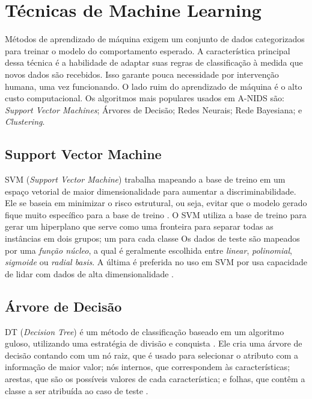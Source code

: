  \section{Técnicas de Machine Learning}
 Métodos de aprendizado de máquina exigem um conjunto de dados categorizados para treinar o modelo do comportamento
 esperado. A característica principal dessa técnica é a habilidade de adaptar suas regras de classificação à medida que
 novos dados são recebidos. Isso garante pouca necessidade por intervenção humana, uma vez funcionando. O lado ruim
 do aprendizado de máquina é o alto custo computacional. Os algoritmos mais populares usados em A-NIDS são:
\emph{Support Vector Machines}; Árvores de Decisão; Redes Neurais; Rede Bayesiana; e \emph{Clustering}.

    \subsection{Support Vector Machine}
    SVM (\emph{Support Vector Machine}) trabalha mapeando a base de treino em um espaço vetorial de maior dimensionalidade para aumentar a discriminabilidade.
    Ele se baseia em minimizar o risco estrutural, ou seja, evitar que o modelo gerado fique muito específico para a base de treino \cite{lin12}.
    O SVM utiliza a base de treino para gerar um hiperplano que serve como uma fronteira para separar todas as instâncias em dois grupos; um para cada classe
    Os dados de teste são mapeados por uma \textit{função núcleo}, a qual é geralmente escolhida entre \textit{linear},
    \textit{polinomial}, \textit{sigmoide} ou \textit{radial basis}. A última é preferida no uso em SVM por usa capacidade de lidar com dados de alta dimensionalidade \cite{lin12}.

    \subsection{Árvore de Decisão}
    DT (\emph{Decision Tree}) é um método de classificação baseado em um algoritmo guloso, utilizando uma estratégia de divisão e conquista \cite{lin12}. Ele
    cria uma árvore de decisão contando com um nó raiz, que é usado para selecionar o atributo com a informação de maior valor;
    nós internos, que correspondem às características; arestas, que são os possíveis valores de cada característica; e
    folhas, que contêm a classe a ser atribuída ao caso de teste \cite{benferhat05}.

